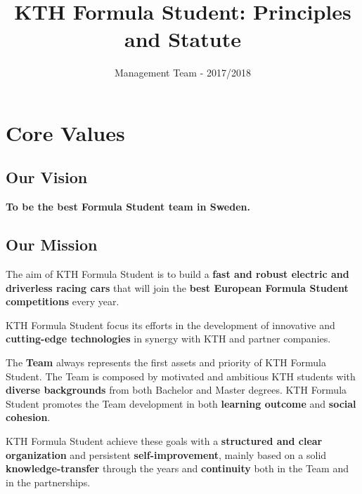 \documentclass[graybox]{svmult}
\begin{document}

\title*{KTH Formula Student: Principles and Statute}
\author{Management Team - 2017/2018}
%
%

\maketitle

\section{Core Values}
\label{sec:2}

\subsection*{Our Vision}

\begin{center}
\Large{{\textbf{To be the best Formula Student team in Sweden.}}}
\end{center}
 
\subsection*{Our Mission}
\large{{The aim of KTH Formula Student is to build a \textbf{fast and robust electric and driverless racing cars} that will join the \textbf{best European Formula Student competitions} every year.

KTH Formula Student focus its efforts in the development of innovative and \textbf{cutting-edge technologies} in synergy with KTH and partner companies.

The \textbf{Team} always represents the first assets and priority of KTH Formula Student. The Team is composed by motivated and ambitious KTH students with \textbf{diverse backgrounds} from both Bachelor and Master degrees. KTH Formula Student promotes the Team development in both \textbf{learning outcome} and \textbf{social cohesion}.

KTH Formula Student achieve these goals with a \textbf{structured and clear organization} and persistent \textbf{self-improvement}, mainly based on a solid \textbf{knowledge-transfer} through the years and \textbf{continuity} both in the Team and in the partnerships.
}}
\end{document}
